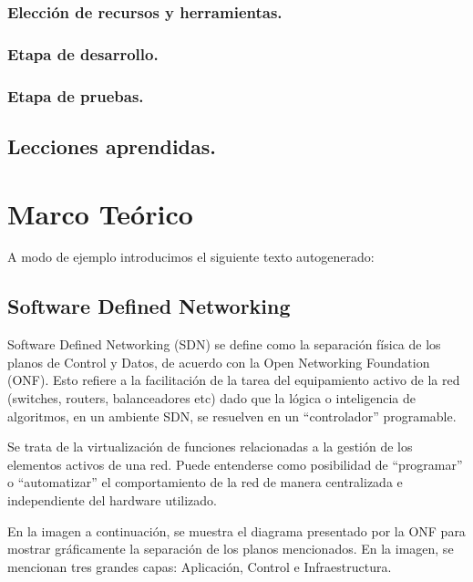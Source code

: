 \documentclass[12pt,a4paper,oneside]{book}
\begin{document}
\subsection{Elección de recursos y herramientas.}

\subsection{Etapa de desarrollo.}

\subsection{Etapa de pruebas.}
 
\section{Lecciones aprendidas.}


\chapter{Marco Teórico} 
\label{marcoteorico} %

A modo de ejemplo introducimos el siguiente texto autogenerado:



\section{Software Defined Networking}
\label{marco_sdn}


Software Defined Networking (SDN) se define como la separación física de los planos de Control y Datos, de acuerdo con la Open Networking Foundation (ONF). Esto refiere a la facilitación de la tarea del equipamiento activo de la red (switches, routers, balanceadores etc) dado que la lógica o inteligencia de algoritmos, en un ambiente SDN, se resuelven en un “controlador” programable.

\vspace{0.5cm}

Se trata de la virtualización de funciones relacionadas a la gestión de los elementos activos de una red. Puede entenderse como posibilidad de “programar” o “automatizar” el comportamiento de la red de manera centralizada e independiente del hardware utilizado. 

\vspace{0.5cm}

En la imagen a continuación, se muestra el diagrama presentado por la ONF para mostrar gráficamente la separación de los planos mencionados. En la imagen, se mencionan tres grandes capas: Aplicación, Control e Infraestructura. 
\end{document}
